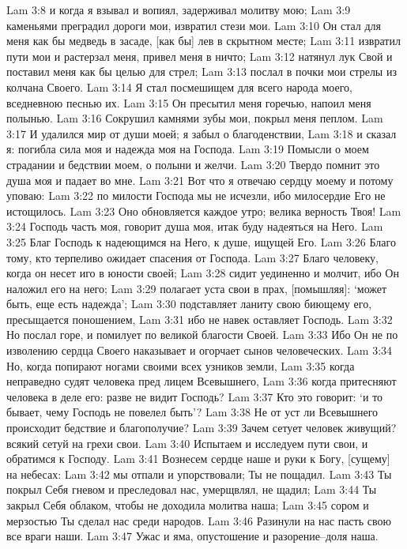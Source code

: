 Lam 3:8  и когда я взывал и вопиял, задерживал молитву мою;
Lam 3:9  каменьями преградил дороги мои, извратил стези мои.
Lam 3:10  Он стал для меня как бы медведь в засаде, [как бы] лев в скрытном месте;
Lam 3:11  извратил пути мои и растерзал меня, привел меня в ничто;
Lam 3:12  натянул лук Свой и поставил меня как бы целью для стрел;
Lam 3:13  послал в почки мои стрелы из колчана Своего.
Lam 3:14  Я стал посмешищем для всего народа моего, вседневною песнью их.
Lam 3:15  Он пресытил меня горечью, напоил меня полынью.
Lam 3:16  Сокрушил камнями зубы мои, покрыл меня пеплом.
Lam 3:17  И удалился мир от души моей; я забыл о благоденствии,
Lam 3:18  и сказал я: погибла сила моя и надежда моя на Господа.
Lam 3:19  Помысли о моем страдании и бедствии моем, о полыни и желчи.
Lam 3:20  Твердо помнит это душа моя и падает во мне.
Lam 3:21  Вот что я отвечаю сердцу моему и потому уповаю:
Lam 3:22  по милости Господа мы не исчезли, ибо милосердие Его не истощилось.
Lam 3:23  Оно обновляется каждое утро; велика верность Твоя!
Lam 3:24  Господь часть моя, говорит душа моя, итак буду надеяться на Него.
Lam 3:25  Благ Господь к надеющимся на Него, к душе, ищущей Его.
Lam 3:26  Благо тому, кто терпеливо ожидает спасения от Господа.
Lam 3:27  Благо человеку, когда он несет иго в юности своей;
Lam 3:28  сидит уединенно и молчит, ибо Он наложил его на него;
Lam 3:29  полагает уста свои в прах, [помышляя]: `может быть, еще есть надежда';
Lam 3:30  подставляет ланиту свою биющему его, пресыщается поношением,
Lam 3:31  ибо не навек оставляет Господь.
Lam 3:32  Но послал горе, и помилует по великой благости Своей.
Lam 3:33  Ибо Он не по изволению сердца Своего наказывает и огорчает сынов человеческих.
Lam 3:34  Но, когда попирают ногами своими всех узников земли,
Lam 3:35  когда неправедно судят человека пред лицем Всевышнего,
Lam 3:36  когда притесняют человека в деле его: разве не видит Господь?
Lam 3:37  Кто это говорит: `и то бывает, чему Господь не повелел быть'?
Lam 3:38  Не от уст ли Всевышнего происходит бедствие и благополучие?
Lam 3:39  Зачем сетует человек живущий? всякий сетуй на грехи свои.
Lam 3:40  Испытаем и исследуем пути свои, и обратимся к Господу.
Lam 3:41  Вознесем сердце наше и руки к Богу, [сущему] на небесах:
Lam 3:42  мы отпали и упорствовали; Ты не пощадил.
Lam 3:43  Ты покрыл Себя гневом и преследовал нас, умерщвлял, не щадил;
Lam 3:44  Ты закрыл Себя облаком, чтобы не доходила молитва наша;
Lam 3:45  сором и мерзостью Ты сделал нас среди народов.
Lam 3:46  Разинули на нас пасть свою все враги наши.
Lam 3:47  Ужас и яма, опустошение и разорение--доля наша.
